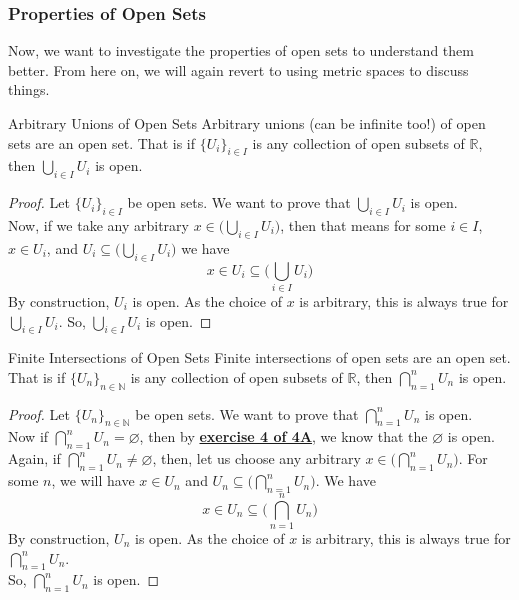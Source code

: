 \subsubsection{Properties of Open Sets}
\noindent Now, we want to investigate the properties of open sets to understand them better. From here on, we will again revert to using metric spaces to discuss things.
\begin{Theorem}{Arbitrary Unions of Open Sets}\label{union_open_sets}
    Arbitrary unions (can be infinite too!) of open sets are an open set. That is if $\{U_i\}_{i\in I}$ is any collection of open subsets of $\mathbb{R}$, then $\bigcup_{i\in I}U_i$ is open.
\end{Theorem}
\begin{proof}
    Let $\{U_i\}_{i\in I}$ be open sets. We want to prove that $\bigcup_{i\in I}U_i$ is open.\\
    Now, if we take any arbitrary $x\in\big(\bigcup_{i\in I}U_i\big)$, then that means for some $i\in I$, $x\in U_i$, and $U_i\subseteq\big(\bigcup_{i\in I}U_i\big)$ we have 
    $$x\in U_i\subseteq\big(\bigcup_{i\in I}U_i\big)$$
    By construction, $U_i$ is open. As the choice of $x$ is arbitrary, this is always true for $\bigcup_{i\in I}U_i$. So, $\bigcup_{i\in I}U_i$ is open.
\end{proof}
\begin{Theorem}{Finite Intersections of Open Sets}\label{finite_inter_open_sets}
    Finite intersections of open sets are an open set. That is if $\{U_n\}_{n\in \mathbb{N}}$ is any collection of open subsets of $\mathbb{R}$, then $\bigcap_{n=1}^n U_{n}$ is open.
\end{Theorem}
\begin{proof}
    Let $\{U_n\}_{n\in\mathbb{N}}$ be open sets. We want to prove that $\bigcap_{n=1}^nU_n$ is open.\\
    Now if $\bigcap_{n=1}^nU_n=\varnothing$, then by \underline{\textbf{exercise 4 of 4A}}, we know that the $\varnothing$ is open. \\
    \noindent Again, if $\bigcap_{n=1}^nU_n\neq\varnothing$, then, let us choose any arbitrary $x\in\big(\bigcap_{n=1}^nU_n\big)$. For some $n$, we will have $x\in U_n$ and $U_n\subseteq\big(\bigcap_{n=1}^nU_n\big)$. We have
    $$x\in U_n\subseteq\big(\bigcap_{n=1}^nU_n\big)$$
    By construction, $U_n$ is open. As the choice of $x$ is arbitrary, this is always true for $\bigcap_{n=1}^nU_n$.\\
    So, $\bigcap_{n=1}^nU_n$ is open.
\end{proof}
